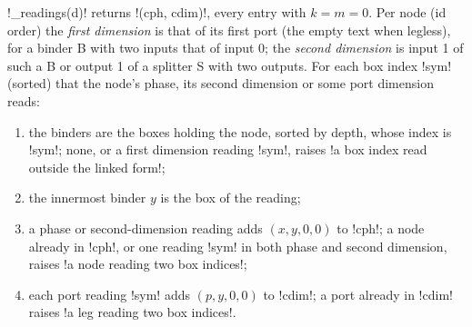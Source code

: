 {{{\lexpy!_readings(d)! returns \lexcode!(cph, cdim)!, every entry with $k = m = 0$. Per node (id order)
the \emph{first dimension} is that of its first port (the empty text when legless), for a binder
B with two inputs that of input 0; the \emph{second dimension} is input 1 of such a B or output 1
of a splitter S with two outputs. For each box index \lexcode!sym! (sorted) that the node's phase,
its second dimension or some port dimension reads:
\begin{enumerate}
\item the binders are the boxes holding the node, sorted by depth, whose index is \lexcode!sym!;
none, or a first dimension reading \lexcode!sym!, raises
\lexcode!a box index read outside the linked form!;
\item the innermost binder $y$ is the box of the reading;
\item a phase or second-dimension reading adds $(x, y, 0, 0)$ to \lexcode!cph!; a node already in
\lexcode!cph!, or one reading \lexcode!sym! in both phase and second dimension, raises
\lexcode!a node reading two box indices!;
\item each port reading \lexcode!sym! adds $(p, y, 0, 0)$ to \lexcode!cdim!; a port already in
\lexcode!cdim! raises \lexcode!a leg reading two box indices!.
\end{enumerate}

}}}
